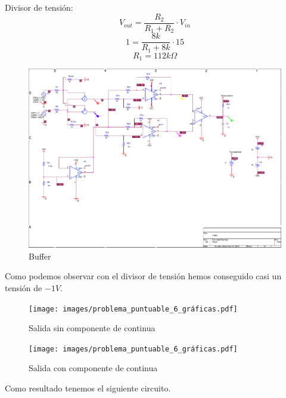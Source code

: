 {  Divisor de tensión:
  \begin{equation}
    V_{out} = \dfrac{R_2}{R_1+R_2}\cdot V_{in}
  \end{equation}
    \begin{equation}
    1 = \dfrac{8k}{R_1+8k}\cdot 15
  \end{equation}
      \begin{equation}
        R_1 = 112k \Omega
    \end{equation}

      \begin{figure}[H]
    \centering  
    \includegraphics[scale=0.8,page=1,clip, trim=1cm 5cm 22cm 8cm]{images/problema_puntuable_6_sche.pdf}
    \caption{Buffer}
  \end{figure}

    Como podemos observar con el divisor de tensión hemos conseguido
    casi un tensión de $-1V$.

      \begin{figure}[H]
    \centering  
    \texttt{[image: images/problema\_puntuable\_6\_gráficas.pdf]}
    \caption{Salida sin componente de continua}
  \end{figure}

      \begin{figure}[H]
    \centering  
    \texttt{[image: images/problema\_puntuable\_6\_gráficas.pdf]}
    \caption{Salida con componente de continua}
  \end{figure}
  
    Como resultado tenemos el siguiente circuito.

}
